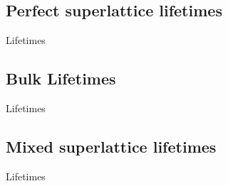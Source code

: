 \documentclass{beamer}
\begin{document}
\subsection{Perfect superlattice lifetimes}
\begin{frame}{Lifetimes}
\begin{figure}[!h]
\begin{center}
\vspace*{-0.8cm}
\hspace*{-1cm}
\renewcommand{\figure}{Fig.}
\label{fig:lifetimes}
\end{center}
\end{figure}
\end{frame}

\subsection{Bulk Lifetimes}
\begin{frame}{Lifetimes}
\begin{figure}[!h]
\begin{center}
\vspace*{-0.8cm}
\hspace*{-1cm}
\renewcommand{\figure}{Fig.}
\label{fig:lifetimes}
\end{center}
\end{figure}
\end{frame}

\subsection{Mixed superlattice lifetimes}
\begin{frame}{Lifetimes}
\begin{figure}[!h]
\begin{center}
\vspace*{-0.8cm}
\hspace*{-1cm}
\renewcommand{\figure}{Fig.}
\label{fig:lifetimes}
\end{center}
\end{figure}
\end{frame}
\end{document}
